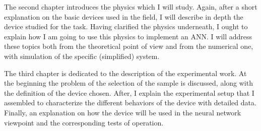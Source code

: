 The second chapter introduces the physics which I will study.
Again, after a short explanation on the basic devices used in the field, I will describe in depth the device studied for the task.
Having clarified the physics underneath, I ought to explain how I am going to use this physics to implement an \ac{ANN}.
I will address these topics both from the theoretical point of view and from the numerical one, with simulation of the specific (simplified) system.

The third chapter is dedicated to the description of the experimental work.
At the beginning the problem of the selection of the sample is discussed, along with the definition of the device chosen.
After, I explain the experimental setup that I assembled to characterize the different behaviors of the device with detailed data.
Finally, an explanation on how the device will be used in the neural network viewpoint and the corresponding tests of operation.
